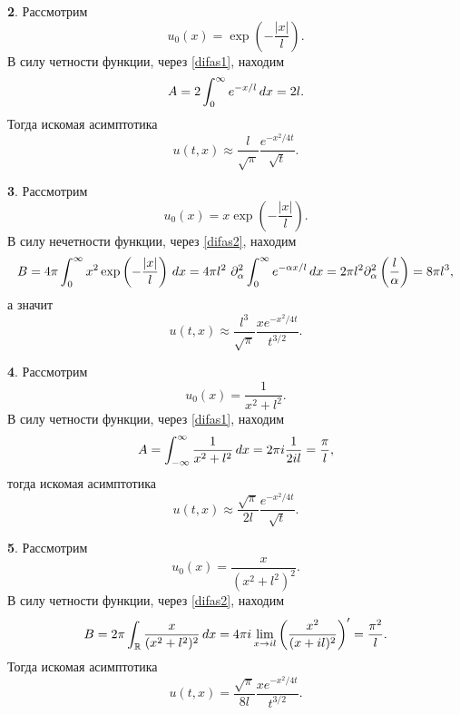\textbf{2}. Рассмотрим
\begin{equation*}
    u_0 (x) = \exp\left(- \frac{|x|}{l}\right).
\end{equation*}
В силу четности функции, через \eqref{difas1}, находим
\begin{equation*}
    A = 2 \int_{0}^{\infty} e^{-x/l} \, d x = 2 l.
\end{equation*}
Тогда искомая асимптотика
\begin{equation*}
    u(t, x) \approx \frac{l}{\sqrt{\pi}} \frac{e^{-x^2 / 4 t}}{\sqrt{t}}.
\end{equation*}

\textbf{3}. Рассмотрим
\begin{equation*}
    u_0 (x) = x \exp\left(- \frac{|x|}{l}\right).
\end{equation*}
В силу нечетности функции, через \eqref{difas2}, находим
\begin{equation*}
    B = 4 \pi \int_0^\infty x^2 \exp\left(- \frac{|x|}{l}\right) \, d x = 4 \pi l^2 \ \partial_\alpha^2 \int_{0}^{\infty} e^{- \alpha x / l} \, d x = 2 \pi l^2 \partial_\alpha^2 \left(\frac{l}{\alpha}\right) = 8 \pi l^3,
\end{equation*}
а значит
\begin{equation*}
    u(t, x) \approx \frac{l^3}{\sqrt{\pi}}\frac{x e^{-{x^2}/{4 t}}}{t^{3/2}}.
\end{equation*}

\textbf{4}. Рассмотрим
\begin{equation*}
    u_0 (x) = \frac{1}{x^2 + l^2}.
\end{equation*}
В силу четности функции, через \eqref{difas1}, находим
\begin{equation*}
    A = \int_{-\infty}^{\infty} \frac{1}{x^2 + l^2} \, d x = 2 \pi i \frac{1}{2 i l} = \frac{\pi}{l},
\end{equation*}
тогда искомая асимптотика
\begin{equation*}
    u(t, x) \approx \frac{\sqrt{\pi}}{2 l} \frac{e^{-x^2 / 4 t}}{\sqrt{t}}.
\end{equation*}

\textbf{5}. Рассмотрим
\begin{equation*}
    u_0 (x) = \frac{x}{(x^2 + l^2)^2}.
\end{equation*}
В силу четности функции, через \eqref{difas2}, находим
\begin{equation*}
    B = 2 \pi \int_{ \mathbb{R}} \frac{x}{(x^2 + l^2)^2} \, d x = 4 \pi i
    \lim_{x \to i l} \left(\frac{x^2}{(x + il)^2}\right)' = \frac{\pi^2}{l}.
\end{equation*}
Тогда искомая асимптотика
\begin{equation*}
    u(t, x) = \frac{\sqrt{\pi}}{8 l} \frac{x e^{-{x^2}/{4 t}}}{t^{3/2}}.
\end{equation*}